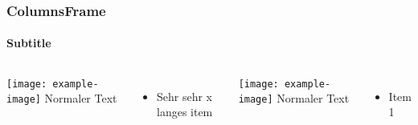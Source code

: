 \documentclass{beamer}
\begin{document}
\begin{frame}
  \frametitle{ColumnsFrame}
  \framesubtitle{Subtitle}
  \begin{columns}
    \texttt{[image: example-image]}
    Normaler Text
    \begin{itemize}
      \item<1->{Sehr sehr x langes item}
    \end{itemize}
    \texttt{[image: example-image]}
    Normaler Text
    \begin{itemize}
      \item<1->{Item 1}
    \end{itemize}
  \end{columns}
\end{frame}
\end{document}
